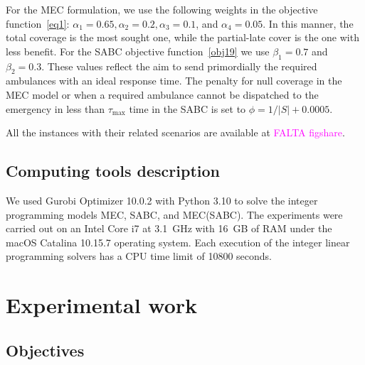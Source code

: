   For the MEC formulation, we use the following weights in the objective function~\eqref{eq1}: $\alpha_1= 0.65, \alpha_2= 0.2, \alpha_3= 0.1$, and $\alpha_4= 0.05$. In this manner, the total coverage is the most sought one, while the partial-late cover is the one with less benefit. For the SABC objective function~\eqref{obj19} we use $\beta_1 = 0.7$ and $\beta_2 = 0.3$. These values reflect the aim to send primordially the required ambulances with an ideal response time. The penalty for null coverage in the MEC model or when a required ambulance cannot be dispatched to the emergency in less than $\tau_{\max}$ time in the SABC is set to $\phi =   1/ |S|  + 0.0005$.

All the instances with their related scenarios are available at \textcolor{magenta}{FALTA figshare}.

\section{Computing tools description}
We used Gurobi Optimizer 10.0.2 with Python 3.10 to solve the integer programming models MEC, SABC, and MEC(SABC).
The experiments were carried out on an Intel Core i7 at 3.1~GHz with 16~GB of RAM under the macOS Catalina 10.15.7 operating system. Each execution of the integer linear programming solvers has a CPU time limit of 10800 seconds. 



\chapter{Experimental work}\label{cap:exper}

\section{Objectives}

